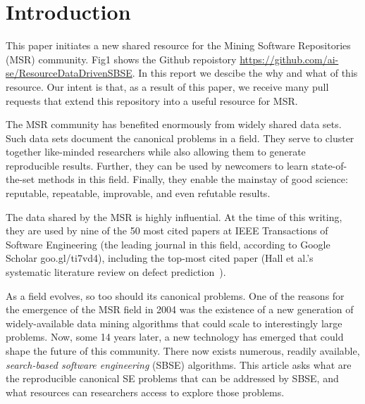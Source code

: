 \documentclass[table, xcdraw, sigconf,review, anonymous]{acmart}
\begin{document}


\keywords{}


\maketitle
\pagestyle{plain}
% 
\section{Introduction}
This paper initiates a new shared resource for the Mining Software
Repositories (MSR) community.
Fig1 shows the Github repoistory \href{ai-se/ResourcesDataDrivenSBSE}{https://github.com/ai-se/ResourceDataDrivenSBSE}. In this report we descibe the why and
what of this resource. Our intent is that, as a result
of this paper, we receive many pull requests that extend
this repository into a useful resource for   MSR.


The MSR  community has benefited enormously from widely shared data sets.  Such data sets document the canonical problems in a field.
They serve to cluster together like-minded researchers while also
  allowing   them to generate reproducible results. Further, they can be used by
   newcomers to learn state-of-the-set methods in this field. Finally, they enable the mainstay of good science:
reputable, repeatable,  improvable, and even refutable results.

The data shared by the MSR is highly influential.
At the time of this writing, they are used by nine of the 50 most cited papers at IEEE Transactions of Software Engineering (the leading journal in this field, according to Google Scholar  goo.gl/ti7vd4),
including the top-most cited paper (Hall et al.'s systematic literature review on defect prediction~\cite{hall12tse}).

As a field evolves, so too should its canonical problems. One of the reasons for the emergence of the MSR field in 2004 was the existence of a new generation of widely-available data mining
algorithms that could scale to interestingly large problems.  Now, some 14 years later, a new technology has emerged that could shape the future of this community. There now exists numerous, readily
available, {\em search-based software engineering} (SBSE) algorithms. This article asks what are the reproducible
canonical SE problems that can be addressed by SBSE, and what resources can researchers access to explore those problems.
\end{document}
